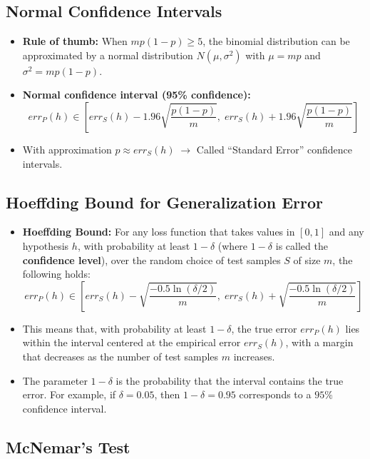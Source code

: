 \subsection{Normal Confidence Intervals}

\begin{itemize}
    \item \textbf{Rule of thumb:} When $mp(1-p) \geq 5$, the binomial distribution can be approximated by a normal distribution $N(\mu, \sigma^2)$ with $\mu = mp$ and $\sigma^2 = mp(1-p)$.
    \item \textbf{Normal confidence interval (95\% confidence):}
    \[
        err_P(h) \in \left[ err_S(h) - 1.96 \sqrt{\frac{p(1-p)}{m}},\; err_S(h) + 1.96 \sqrt{\frac{p(1-p)}{m}} \right]
    \]
    \item With approximation $p \approx err_S(h) \; \rightarrow$ Called ``Standard Error'' confidence intervals.
\end{itemize}

\subsection{Hoeffding Bound for Generalization Error}

\begin{itemize}
    \item \textbf{Hoeffding Bound:} For any loss function that takes values in $[0,1]$ and any hypothesis $h$, with probability at least $1 - \delta$ (where $1-\delta$ is called the \textbf{confidence level}), over the random choice of test samples $S$ of size $m$, the following holds:
    \[
        err_P(h) \in \left[ err_S(h) - \sqrt{\frac{-0.5 \ln(\delta/2)}{m}},\; err_S(h) + \sqrt{\frac{-0.5 \ln(\delta/2)}{m}} \right]
    \]
    \item This means that, with probability at least $1-\delta$, the true error $err_P(h)$ lies within the interval centered at the empirical error $err_S(h)$, with a margin that decreases as the number of test samples $m$ increases.
    \item The parameter $1-\delta$ is the probability that the interval contains the true error. For example, if $\delta = 0.05$, then $1-\delta = 0.95$ corresponds to a $95\%$ confidence interval.
\end{itemize}

\subsection{McNemar's Test}

